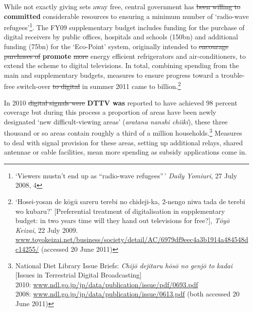 \documentclass[11pt, oneside, a4paper, headsepline]{scrartcl}
\newcommand{\cjk}[1]{{\fontspec[Scale=0.9]{Hiragino Mincho Pro}#1}}
\newcommand{\ty}{\textyen}
\begin{document}
While not exactly giving sets away free, central government has \st{been willing to} \textbf{committed} considerable resources to ensuring a minimum number of `radio-wave refugees'\footnote{`Viewers mustn't end up as ``radio-wave refugees''\,' \emph{Daily Yomiuri}, 27 July 2008, 4}. The FY09 supplementary budget includes funding for the purchase of digital receivers by public offices, hospitals and schools (\ty150bn) and additional funding (\ty75bn) for the `Eco-Point' system, originally intended to \st{encourage purchases of} \textbf{promote} \st{more} energy efficient refrigerators and air-conditioners, to extend the scheme to digital televisions. In total, combining spending from the main and supplementary budgets, measures to ensure progress toward a trouble-free switch-over \st{to digital} in summer 2011 came to \ty420 billion.\footnote{`Hosei-yosan de k\={o}g\={u} sareru terebi no chideji-ka, 2-nengo niwa tada de terebi wo kubaru?' [Preferential treatment of digitalisation in supplementary budget: in two years time will they hand out televisions for free?], \emph{T\={o}y\={o} Keizai}, 22 July 2009.\\ \url{www.toyokeizai.net/business/society/detail/AC/6979df9eec4a3b1914a484548dc14255/}  (accessed 20 June 2011)}


In 2010 \st{digital signals were} \textbf{DTTV was} reported to have achieved 98 percent coverage but during this process a proportion of areas have been newly designated `new difficult-viewing areas' (\textit{aratana nanshi chiiki}), these three thousand or so areas contain roughly a third of a million households.\footnote{National Diet Library Issue Briefs: \textit{Chij\={o} dejitaru h\={o}s\={o} no genj\={o} to kadai} [Issues in Terrestrial Digital Broadcasting]\\ 2010: \url{www.ndl.go.jp/jp/data/publication/issue/pdf/0693.pdf}\\ 2008: \url{www.ndl.go.jp/jp/data/publication/issue/0613.pdf}\label{ndl-note}  (both accessed 20 June 2011)} Measures to deal with signal provision for these areas, setting up additional relays, shared antennae or cable facilities, mean more spending as subsidy applications come in.%

\bigskip

\end{document}
